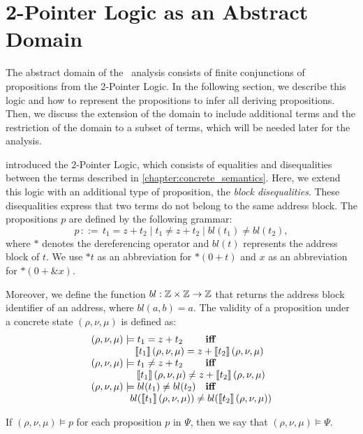 \chapter{2-Pointer Logic as an Abstract Domain}\label{chapter:2pointer}

The abstract domain of the \cpo\ analysis consists of finite conjunctions of propositions from the 2-Pointer Logic.
In the following section, we describe this logic and how to represent the propositions to infer all deriving propositions.
Then, we discuss the extension of the domain to include additional terms and the restriction of the domain to a subset of terms, which will be needed later for the analysis.

\textcite{2pointer} introduced the 2-Pointer Logic, which consists of equalities and disequalities between the terms described in \cref{chapter:concrete_semantics}.
Here, we extend this logic with an additional type of proposition, the \emph{block disequalities}.
These disequalities express that two terms do not belong to the same address block.
The propositions $p$ are defined by the following grammar:
\[
  p\,{::=}\,t_1=z+t_2 \mid t_1\neq z+t_2\mid bl(t_1) \neq bl(t_2),
\]
where $*$ denotes the dereferencing operator and $bl(t)$ represents the address block of $t$.
We use $*t$ as an abbreviation for $*(0+t)$ and $x$ as an abbreviation for $*(0+\&x)$.

Moreover, we define the function $bl : \mathbb{Z} \times \mathbb{Z} \rightarrow \mathbb{Z}$ that returns the address block identifier of an address, where $bl(a,b) = a$.
The validity of a proposition under a concrete state $(\rho,\nu,\mu)$ is defined as:
\[
  \begin{array}{ll}
    (\rho,\nu,\mu)\models t_1 = z+t_2          & \textbf{iff}
    \\ \multicolumn{2}{c}{\quad\quad\quad\quad\sem{t_1}\,(\rho,\nu,\mu) = z+\sem{t_2}\,(\rho,\nu,\mu)}  \\
    (\rho,\nu,\mu)\models t_1 \neq z+t_2       & \textbf{iff}
    \\ \multicolumn{2}{c}{\quad\quad\quad\quad\sem{t_1}\,(\rho,\nu,\mu) \neq z+\sem{t_2}\,(\rho,\nu,\mu)} \\
    (\rho,\nu,\mu)\models bl(t_1) \neq bl(t_2) & \textbf{iff}
    \\ \multicolumn{2}{c}{\quad\quad\quad\quad bl(\sem{t_1}\,(\rho, \nu, \mu)) \neq bl(\sem{t_2}\,(\rho, \nu, \mu))}
  \end{array}
\]

If $(\rho, \nu, \mu)\models p$ for each proposition $p$ in $\Psi$, then we say that $(\rho, \nu, \mu) \models \Psi$.

